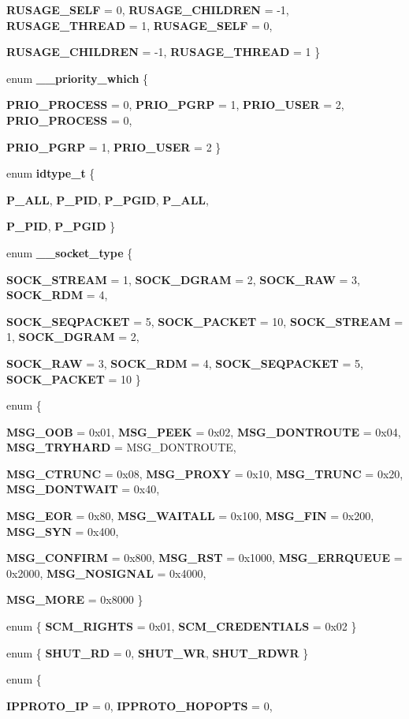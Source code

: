 \begin{DoxyCompactItemize}
{\bf RUSAGE\_\-SELF} =  0, 
{\bf RUSAGE\_\-CHILDREN} =  -\/1, 
{\bf RUSAGE\_\-THREAD} =  1, 
{\bf RUSAGE\_\-SELF} =  0, 
\par
{\bf RUSAGE\_\-CHILDREN} =  -\/1, 
{\bf RUSAGE\_\-THREAD} =  1
 \}
\item 
enum {\bf \_\-\_\-priority\_\-which} \{ \par
{\bf PRIO\_\-PROCESS} =  0, 
{\bf PRIO\_\-PGRP} =  1, 
{\bf PRIO\_\-USER} =  2, 
{\bf PRIO\_\-PROCESS} =  0, 
\par
{\bf PRIO\_\-PGRP} =  1, 
{\bf PRIO\_\-USER} =  2
 \}
\item 
enum {\bf idtype\_\-t} \{ \par
{\bf P\_\-ALL}, 
{\bf P\_\-PID}, 
{\bf P\_\-PGID}, 
{\bf P\_\-ALL}, 
\par
{\bf P\_\-PID}, 
{\bf P\_\-PGID}
 \}
\item 
enum {\bf \_\-\_\-socket\_\-type} \{ \par
{\bf SOCK\_\-STREAM} =  1, 
{\bf SOCK\_\-DGRAM} =  2, 
{\bf SOCK\_\-RAW} =  3, 
{\bf SOCK\_\-RDM} =  4, 
\par
{\bf SOCK\_\-SEQPACKET} =  5, 
{\bf SOCK\_\-PACKET} =  10, 
{\bf SOCK\_\-STREAM} =  1, 
{\bf SOCK\_\-DGRAM} =  2, 
\par
{\bf SOCK\_\-RAW} =  3, 
{\bf SOCK\_\-RDM} =  4, 
{\bf SOCK\_\-SEQPACKET} =  5, 
{\bf SOCK\_\-PACKET} =  10
 \}
\item 
enum \{ \par
{\bf MSG\_\-OOB} =  0x01, 
{\bf MSG\_\-PEEK} =  0x02, 
{\bf MSG\_\-DONTROUTE} =  0x04, 
{\bf MSG\_\-TRYHARD} =  MSG\_\-DONTROUTE, 
\par
{\bf MSG\_\-CTRUNC} =  0x08, 
{\bf MSG\_\-PROXY} =  0x10, 
{\bf MSG\_\-TRUNC} =  0x20, 
{\bf MSG\_\-DONTWAIT} =  0x40, 
\par
{\bf MSG\_\-EOR} =  0x80, 
{\bf MSG\_\-WAITALL} =  0x100, 
{\bf MSG\_\-FIN} =  0x200, 
{\bf MSG\_\-SYN} =  0x400, 
\par
{\bf MSG\_\-CONFIRM} =  0x800, 
{\bf MSG\_\-RST} =  0x1000, 
{\bf MSG\_\-ERRQUEUE} =  0x2000, 
{\bf MSG\_\-NOSIGNAL} =  0x4000, 
\par
{\bf MSG\_\-MORE} =  0x8000
 \}
\item 
enum \{ {\bf SCM\_\-RIGHTS} =  0x01, 
{\bf SCM\_\-CREDENTIALS} =  0x02
 \}
\item 
enum \{ {\bf SHUT\_\-RD} =  0, 
{\bf SHUT\_\-WR}, 
{\bf SHUT\_\-RDWR}
 \}
\item 
enum \{ \par
{\bf IPPROTO\_\-IP} =  0, 
{\bf IPPROTO\_\-HOPOPTS} =  0, 

\end{DoxyCompactItemize}
